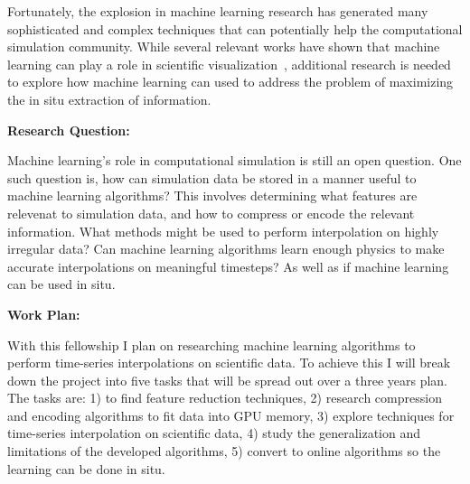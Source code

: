 \documentclass[12pt]{article}
\begin{document}
Fortunately, the explosion in machine learning research has generated many
sophisticated and complex techniques that can potentially help the computational simulation
community. 
%
While several relevant works have shown that machine learning can play a role in scientific
visualization~\cite{super,Berg,He}, additional research is needed to explore how
machine learning can used to address the problem of maximizing the in situ extraction
of information.


\textbf{Research Question:}

Machine learning's role in computational simulation is still an open question.
%
One such question is, how can simulation data be stored in a manner useful to machine
learning algorithms?
%
This involves determining what features are relevenat to simulation data, and 
how to compress or encode the relevant information.
%
What methods might be used to perform interpolation on highly irregular data?
Can machine learning algorithms learn enough physics to make accurate interpolations
on meaningful timesteps?
%
As well as if machine learning can be used in situ. 
%


\textbf{Work Plan:}

 With this fellowship I plan on researching machine learning algorithms
to perform time-series interpolations on scientific data. To achieve this I will
break down the project into five tasks that will be spread out over a three
years plan. The tasks are: 1) to find feature reduction techniques, 2) research
compression and encoding algorithms to fit data into GPU memory, 3) explore
techniques for time-series interpolation on scientific data, 4) study the
generalization and limitations of the developed algorithms, 5) convert to online
algorithms so the learning can be done in situ.

\end{document}
